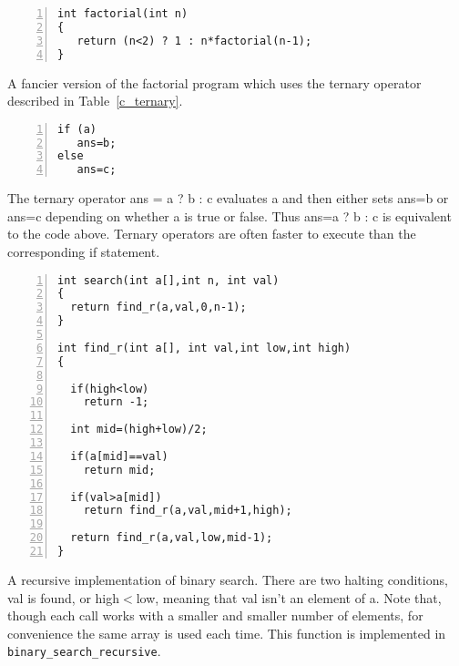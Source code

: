 \documentclass[11pt,a4paper]{scrartcl}
\begin{document}
\begin{table}
\begin{lstlisting}[numbers=left]
int factorial(int n)
{
   return (n<2) ? 1 : n*factorial(n-1);
}

\end{lstlisting}
\caption{A fancier version of the factorial program which uses the ternary operator described in Table~\ref{c_ternary}.\label{c_factorial_fancy}}
\end{table}
                  

   
\begin{table}
\begin{lstlisting}[numbers=left]
if (a)
   ans=b;
else 
   ans=c;
\end{lstlisting}
\caption{The ternary operator ans = a ? b : c evaluates a and then
  either sets ans=b or ans=c depending on whether a is true or
  false.  Thus ans=a ? b : c is equivalent to the code above. Ternary
  operators are often faster to execute than the corresponding if
  statement.\label{c_ternary}}
\end{table}
 


\begin{table}
\begin{lstlisting}[numbers=left]
int search(int a[],int n, int val)
{
  return find_r(a,val,0,n-1);
}
 
int find_r(int a[], int val,int low,int high)
{

  if(high<low)
    return -1;

  int mid=(high+low)/2;

  if(a[mid]==val)
    return mid;

  if(val>a[mid])
    return find_r(a,val,mid+1,high);
  
  return find_r(a,val,low,mid-1);
}
\end{lstlisting}
\caption{A recursive implementation of binary search. There are two
  halting conditions, val is found, or high$<$low, meaning that val
  isn't an element of a. Note that, though each call works with a
  smaller and smaller number of elements, for convenience the same
  array is used each time. This function is implemented in \texttt{
    binary\_search\_recursive}.\label{c_binary_search_recursive}}
\end{table}
\end{document}
